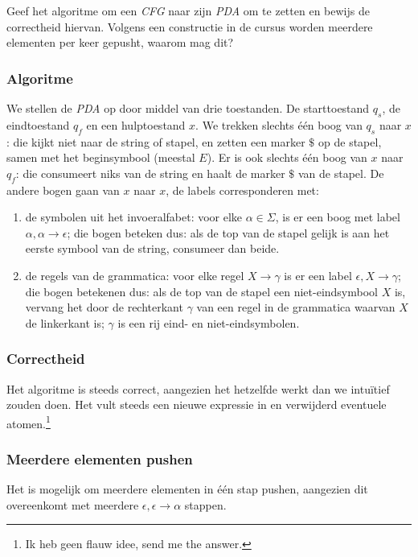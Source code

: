 \begin{quest}
Geef het algoritme om een \emph{CFG} naar zijn \emph{PDA} om te zetten en bewijs de correctheid hiervan.
Volgens een constructie in de cursus worden meerdere elementen per keer gepusht, waarom mag dit?
\end{quest}

\subsubsection*{Algoritme}

We stellen de \emph{PDA} op door middel van drie toestanden. De starttoestand $q_s$, de eindtoestand $q_f$ en een hulptoestand $x$. We trekken slechts \'e\'en boog van $q_s$ naar $x$: die kijkt niet naar de string of stapel, en zetten een marker $\$$ op de stapel, samen met het beginsymbool (meestal $E$). Er is ook slechts \'e\'en boog van $x$ naar $q_f$: die consumeert niks van de string en haalt de marker $\$$ van de stapel. De andere bogen gaan van $x$ naar $x$, de labels corresponderen met:
\begin{enumerate}
	\item de symbolen uit het invoeralfabet: voor elke $\alpha \in \Sigma$, is er een boog met label $\alpha, \alpha \rightarrow \epsilon$; die bogen beteken dus: als de top van de stapel gelijk is aan het eerste symbool van de string, consumeer dan beide.
	\item de regels van de grammatica: voor elke regel $X \rightarrow \gamma$ is er een label $\epsilon,X \rightarrow \gamma$; die bogen betekenen dus: als de top van de stapel een niet-eindsymbool $X$ is, vervang het door de rechterkant $\gamma$ van een regel in de grammatica waarvan $X$ de linkerkant is; $\gamma$ is een rij eind- en niet-eindsymbolen.
\end{enumerate}

\subsubsection*{Correctheid}

Het algoritme is steeds correct, aangezien het hetzelfde werkt dan we intu\"itief zouden doen. Het vult steeds een nieuwe expressie in en verwijderd eventuele atomen.\footnote{Ik heb geen flauw idee, send me the answer.}

\subsubsection*{Meerdere elementen pushen}

Het is mogelijk om meerdere elementen in \'e\'en stap pushen, aangezien dit overeenkomt met meerdere $\epsilon, \epsilon \rightarrow \alpha$ stappen.
